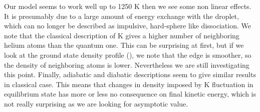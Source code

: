 Our model seems to work well up to 1250 K then we see some non linear effects. It is presumably due to a large amount of energy exchange with the droplet, which can no longer be described as impulsive, hard-sphere like dissociation.
We note that the classical description of K gives a higher number of neighboring helium atoms than the quantum one.
This can be surprising at first, but if we look at the ground state density profile (), we note that the edge is smoother, so the density of neighboring atoms is lower. 
Nevertheless we are still investigating this point. 
Finally, adiabatic and diabatic descriptions seem to give similar results in classical case. 
This means that changes in density imposed by K fluctuation in equilibrium state has more or less no consequence on final kinetic energy, which is not really surprising as we are looking for asymptotic value.


